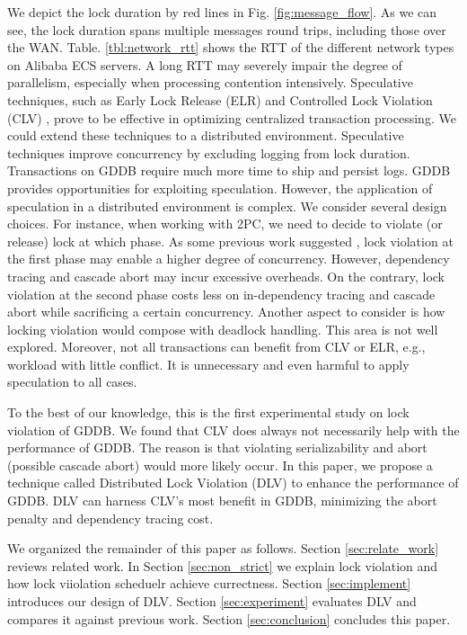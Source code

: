 \documentclass[conference]{IEEEtran}
\begin{document}
We depict the lock duration by red lines in Fig.    \ref{fig:message_flow}.
As we can see, the lock duration spans multiple messages round trips, including those over the WAN.
Table.    \ref{tbl:network_rtt} shows the RTT of the different network types on Alibaba ECS servers.
A long RTT may severely impair the degree of parallelism, especially when processing contention intensively.
Speculative techniques, such as Early Lock Release (ELR) \cite{EfficientLocking:conf/vldb/KimuraGK12} and Controlled Lock Violation (CLV)
\cite{CLV:conf/sigmod/GraefeLKTV13}, prove to be effective in optimizing centralized transaction processing.
We could extend these techniques to a distributed environment.
Speculative techniques improve concurrency by excluding logging from lock duration.
Transactions on GDDB require much more time to ship and persist logs.
GDDB provides opportunities for exploiting speculation.
However, the application of speculation in a distributed environment is complex.
We consider several design choices.
For instance, when working with 2PC, we need to decide to violate (or release) lock at which phase.
As some previous work suggested \cite{CLV:conf/sigmod/GraefeLKTV13}, lock violation at the first phase may enable a higher degree of concurrency.
However, dependency tracing and cascade abort may incur excessive overheads.
On the contrary, lock violation at the second phase costs less on in-dependency tracing and cascade abort while sacrificing a certain concurrency.
Another aspect to consider is how locking violation would compose with deadlock handling.
This area is not well explored.
Moreover, not all transactions can benefit from CLV or ELR, e.g., workload with little conflict.
It is unnecessary and even harmful to apply speculation to all cases.


To the best of our knowledge, this is the first experimental study on lock violation of GDDB.
We found that CLV does always not necessarily help with the performance of GDDB.
The reason is that violating serializability and abort (possible cascade abort) would more likely occur.
In this paper, we propose a technique called Distributed Lock Violation (DLV) to enhance the performance of GDDB.
DLV can harness CLV's most benefit in GDDB, minimizing the abort penalty and dependency tracing cost.

We organized the remainder of this paper as follows.
Section \ref{sec:relate_work} reviews related work.
In Section \ref{sec:non_strict} we explain lock violation and how lock viiolation scheduelr achieve currectness.
Section \ref{sec:implement} introduces our design of DLV.
Section \ref{sec:experiment} evaluates DLV and compares it against previous work.
Section \ref{sec:conclusion} concludes this paper.
\end{document}
